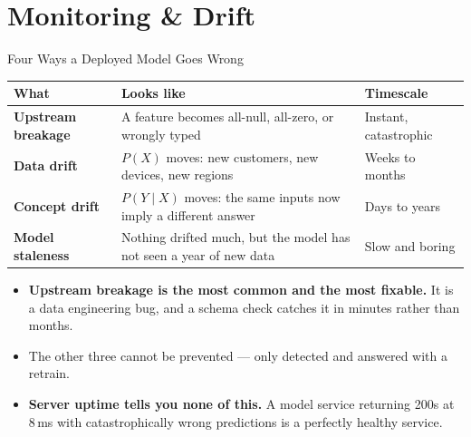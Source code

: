 \section{Monitoring \& Drift}

\begin{frame}{Four Ways a Deployed Model Goes Wrong}

    \centering
    \renewcommand{\arraystretch}{1.3}
    {\scriptsize
    \begin{tabular}{p{2.9cm}|p{4.3cm}|p{4.3cm}}
        \toprule
        \textbf{What} & \textbf{Looks like} & \textbf{Timescale} \\
        \midrule
        \textbf{Upstream breakage} & A feature becomes all-null, all-zero, or wrongly typed &
            Instant, catastrophic \\
        \textbf{Data drift} & $P(X)$ moves: new customers, new devices, new regions &
            Weeks to months \\
        \textbf{Concept drift} & $P(Y \mid X)$ moves: the same inputs now imply a different answer &
            Days to years \\
        \textbf{Model staleness} & Nothing drifted much, but the model has not seen a year of new data &
            Slow and boring \\
        \bottomrule
    \end{tabular}}

    \vspace{0.3em}
    \begin{itemize}
        \item \textbf{Upstream breakage is the most common and the most fixable.} It is a data engineering
              bug, and a schema check catches it in minutes rather than months.
        \item The other three cannot be prevented --- only detected and answered with a retrain.
        \item \textbf{Server uptime tells you none of this.} A model service returning 200s at 8\,ms with
              catastrophically wrong predictions is a perfectly healthy service.
    \end{itemize}

\end{frame}
